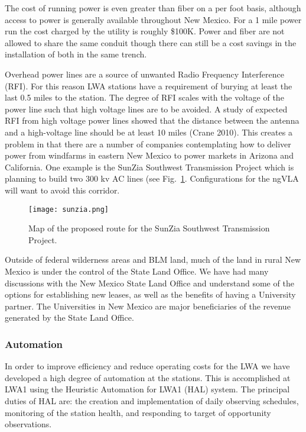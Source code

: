 \documentclass[11pt]{article}
\begin{document}
The cost of running power is even greater than fiber on a per foot basis, although access to power is generally available throughout New Mexico.  For a 1 mile power run the cost charged by the utility is roughly \$100K.   Power and fiber are not allowed to share the same conduit though there can still be a cost savings in the installation of both in the same trench.  

Overhead power lines are a source of unwanted Radio Frequency Interference (RFI).  For this reason LWA stations have a requirement of burying at least the last 0.5 miles to the station.  The degree of RFI scales with the voltage of the power line such that high voltage lines are to be avoided.  A study of expected RFI from high voltage power lines showed that the distance between the antenna and a high-voltage line should be at least 10 miles (Crane 2010).  This creates a problem in that there are a number of companies contemplating how to deliver power from windfarms in eastern New Mexico to power markets in Arizona and California.  One example is
the SunZia Southwest Transmission Project which is planning to build two 
300 kv AC lines (see Fig.~\ref{sunzia}.  Configurations for the ngVLA will want to avoid this corridor.

\begin{figure}[ht!]
\begin{center}
\vspace{-1cm}
\texttt{[image: sunzia.png]}
\end{center}
\vspace{-0.5cm}
  \caption{
Map of the proposed route for the SunZia Southwest Transmission Project.
}
\label{sunzia}
\end{figure}


Outside of federal wilderness areas and BLM land, much of the land in
rural New Mexico is under the control of the State Land Office. We
have had many discussions with the New Mexico State Land Office and
understand some of the options for establishing new leases, as well as
the benefits of having a University partner.  The Universities in New Mexico are major beneficiaries of the revenue generated by the State Land Office. 

\subsubsection{Automation}

In order to improve efficiency and reduce operating costs for the LWA we
have developed a high degree of automation at the stations.  This is
accomplished at LWA1 using the Heuristic Automation for LWA1 (HAL)
system.  The principal duties of HAL are:  the creation and
implementation of daily observing schedules, monitoring of the station
health, and responding to target of opportunity observations.
\end{document}
